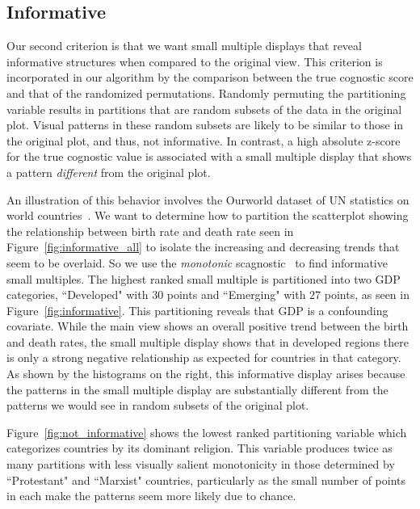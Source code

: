 \subsection{Informative}
Our second criterion is that we want small multiple displays that reveal informative structures when compared to the original view. This criterion is incorporated in our algorithm by the comparison between the true cognostic score and that of the randomized permutations. Randomly permuting the partitioning variable results in partitions that are random subsets of the data in the original plot. Visual patterns in these random subsets are likely to be similar to those in the original plot, and thus, not informative. In contrast, a high absolute z-score for the true cognostic value is associated with a small multiple display that shows a pattern \emph{different} from the original plot.

An illustration of this behavior involves the Ourworld dataset of UN statistics on world countries~\cite{Wilkinson2005GG}. We want to determine how to partition the scatterplot showing the relationship between birth rate and death rate seen in Figure~\ref{fig:informative_all} to isolate the increasing and decreasing trends that seem to be overlaid. So we use the \emph{monotonic} scagnostic~\cite{Wilkinson2005} to find informative small multiples. The highest ranked small multiple is partitioned into two GDP categories, ``Developed" with $30$ points and ``Emerging" with $27$ points, as seen in Figure~\ref{fig:informative}. This partitioning reveals that GDP is a confounding covariate. While the main view shows an overall positive trend between the birth and death rates, the small multiple display shows that in developed regions there is only a strong negative relationship as expected for countries in that category. As shown by the histograms on the right, this informative display arises because the patterns in the small multiple display are substantially different from the patterns we would see in random subsets of the original plot.

Figure~\ref{fig:not_informative} shows the lowest ranked partitioning variable which categorizes countries by its dominant religion. This variable produces twice as many partitions with less visually salient monotonicity in those determined by ``Protestant" and ``Marxist" countries, particularly as the small number of points in each make the patterns seem more likely due to chance. %

